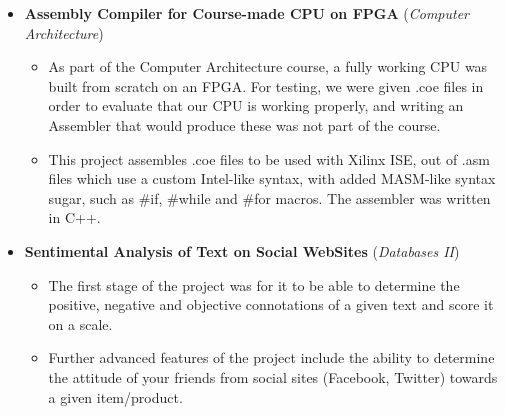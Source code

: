 \documentclass[11pt,a4paper,sans]{moderncv}
\begin{document}
\begin{itemize}
{\begin{itemize}
		\end{itemize}}
	\item	\label{arch}  \textbf{Assembly Compiler for Course-made CPU on FPGA} (\textit{Computer Architecture})
		{\small\begin{itemize}
		\item	As part of the Computer Architecture course, a fully working CPU was built from scratch on an FPGA. For testing, we were given .coe files in order to evaluate that our CPU is working properly, and writing an Assembler that would produce these was not part of the course.
		\item	This project assembles .coe files to be used with Xilinx ISE, out of .asm files which use a custom Intel-like syntax, with added MASM-like syntax sugar, such as \#if, \#while and \#for macros. The assembler was written in C++.
		\end{itemize}}
	\item	\label{db2}  \textbf{Sentimental Analysis of Text on Social WebSites} (\textit{Databases II})
		{\small\begin{itemize}
		\item	The first stage of the project was for it to be able to determine the positive, negative and objective connotations of a given text and score it on a scale.
		\item	Further advanced features of the project include the ability to determine the attitude of your friends from social sites (Facebook, Twitter) towards a given item/product.
		\end{itemize}}
	\end{itemize}
	
\end{document}
